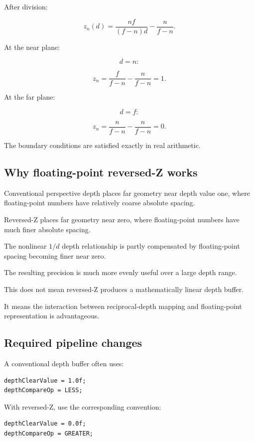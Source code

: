 After division:

\[
 \boxed{ z_n(d)= \frac{nf}{(f-n)d} -\frac n{f-n} }.
\]

At the near plane:

\[
 d=n:
\]

\[
 z_n= \frac f{f-n}-\frac n{f-n}=1.
\]

At the far plane:

\[
 d=f:
\]

\[
 z_n= \frac n{f-n}-\frac n{f-n}=0.
\]

The boundary conditions are satisfied exactly in real arithmetic.

\subsection{Why floating-point reversed-Z works}\label{02-foundations-ii-ch033-why-floating-point-reversed-z-works}

Conventional perspective depth places far geometry near depth value one, where floating-point numbers have relatively coarse absolute spacing.

Reversed-Z places far geometry near zero, where floating-point numbers have much finer absolute spacing.

The nonlinear \(1/d\) depth relationship is partly compensated by floating-point spacing becoming finer near zero.

The resulting precision is much more evenly useful over a large depth range.

This does not mean reversed-Z produces a mathematically linear depth buffer.

It means the interaction between reciprocal-depth mapping and floating-point representation is advantageous.

\subsection{Required pipeline changes}\label{02-foundations-ii-ch033-required-pipeline-changes}

A conventional depth buffer often uses:

\begin{verbatim}
depthClearValue = 1.0f;
depthCompareOp = LESS;
\end{verbatim}

With reversed-Z, use the corresponding convention:

\begin{verbatim}
depthClearValue = 0.0f;
depthCompareOp = GREATER;
\end{verbatim}

